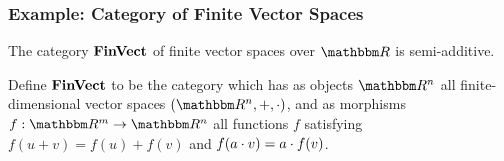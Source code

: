 %
%
%
%
%
%
%

\subsubsection{Example: Category of Finite Vector Spaces}
\label{sec:categories-with-biproducts:fdvect}

The category $\mathbf{FinVect}$ of finite vector spaces over $\RR$ is semi-additive.

\begin{definition}
Define $\mathbf{FinVect}$ to be the category which has as objects $\RR^n$ all finite-dimensional vector spaces
$(\RR^n, +, \mult)$, and as morphisms $f: \RR^m \to \RR^n$ all functions $f$ satisfying $f(u + v) = f(u) +
f(v)$ and $f(a \cdot v) = a \cdot f(v)$.
\end{definition}

